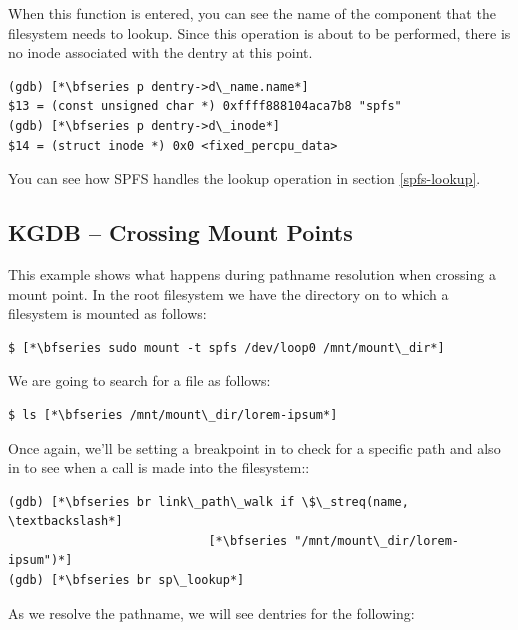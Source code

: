 \noindent
When this function is entered, you can see the name of the component that the filesystem needs to lookup. Since this operation is about to be performed, there is no inode associated with the dentry at this point.

\begin{lstlisting}
(gdb) [*\bfseries p dentry->d\_name.name*]
$13 = (const unsigned char *) 0xffff888104aca7b8 "spfs"
(gdb) [*\bfseries p dentry->d\_inode*]
$14 = (struct inode *) 0x0 <fixed_percpu_data>
\end{lstlisting}

\noindent
You can see how SPFS handles the lookup operation in section \ref{spfs-lookup}.


\subsection{KGDB -- Crossing Mount Points}

This example shows what happens during pathname resolution when crossing a mount point. In the root filesystem we have the directory  on to which a filesystem is mounted as follows:

\begin{lstlisting}
$ [*\bfseries sudo mount -t spfs /dev/loop0 /mnt/mount\_dir*]
\end{lstlisting}

\noindent
We are going to search for a file as follows:

\begin{lstlisting}
$ ls [*\bfseries /mnt/mount\_dir/lorem-ipsum*]
\end{lstlisting}

\noindent
Once again, we'll be setting a breakpoint in  to check for a specific path and also in  to see when a call is made into the filesystem::

\begin{lstlisting}
(gdb) [*\bfseries br link\_path\_walk if \$\_streq(name, \textbackslash*]
                            [*\bfseries "/mnt/mount\_dir/lorem-ipsum")*]
(gdb) [*\bfseries br sp\_lookup*]
\end{lstlisting}

\noindent
As we resolve the pathname, we will see dentries for the following:

